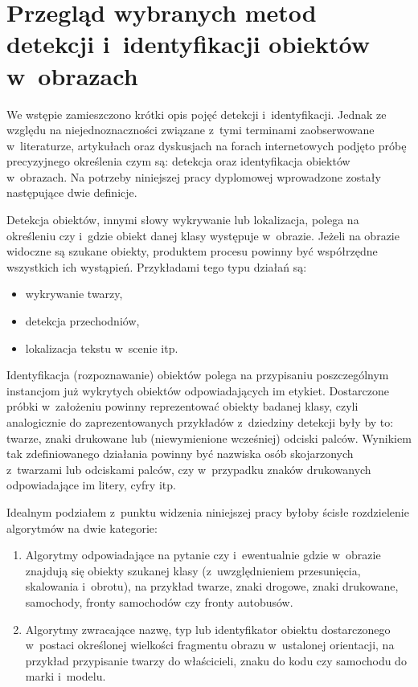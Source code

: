 \chapter{Przegląd wybranych metod detekcji i~identyfikacji
obiektów w~obrazach}

We wstępie zamieszczono krótki opis pojęć detekcji i~identyfikacji.
Jednak ze względu na niejednoznaczności związane z~tymi terminami
zaobserwowane w~literaturze,
artykułach oraz dyskusjach na forach internetowych podjęto próbę
precyzyjnego określenia czym są: detekcja oraz identyfikacja
obiektów w~obrazach. Na potrzeby niniejszej pracy dyplomowej wprowadzone
zostały następujące dwie definicje.

Detekcja obiektów, innymi słowy wykrywanie lub lokalizacja,
polega na określeniu czy i~gdzie obiekt danej klasy występuje w~obrazie.
Jeżeli na obrazie widoczne są szukane obiekty,
produktem procesu powinny być współrzędne wszystkich ich wystąpień.
Przykładami tego typu działań są:

\begin{itemize}
    \item wykrywanie twarzy,
    \item detekcja przechodniów,
    \item lokalizacja tekstu w~scenie itp.
\end{itemize}

Identyfikacja (rozpoznawanie) obiektów polega na przypisaniu
poszczególnym instancjom już wykrytych obiektów odpowiadających im
etykiet. Dostarczone próbki w~założeniu powinny reprezentować
obiekty badanej klasy, czyli analogicznie do zaprezentowanych
przykładów z~dziedziny detekcji były by to: twarze,
znaki drukowane lub (niewymienione wcześniej) odciski palców.
Wynikiem tak zdefiniowanego działania powinny być nazwiska osób
skojarzonych z~twarzami lub odciskami palców,
czy w~przypadku znaków drukowanych odpowiadające im litery, cyfry
itp.

Idealnym podziałem z~punktu widzenia niniejszej pracy byłoby ścisłe
rozdzielenie algorytmów na dwie kategorie:

\begin{enumerate}
    \item Algorytmy odpowiadające na pytanie czy i~ewentualnie gdzie
        w~obrazie
        znajdują się obiekty szukanej klasy (z~uwzględnieniem przesunięcia,
        skalowania i~obrotu), na przykład twarze, znaki drogowe, znaki
        drukowane, samochody, fronty samochodów czy fronty autobusów.
    \item Algorytmy zwracające nazwę, typ lub identyfikator obiektu
        dostarczonego w~postaci określonej wielkości fragmentu obrazu
        w~ustalonej orientacji, na przykład przypisanie twarzy do
        właścicieli, znaku do kodu czy samochodu do marki i~modelu.
\end{enumerate}

